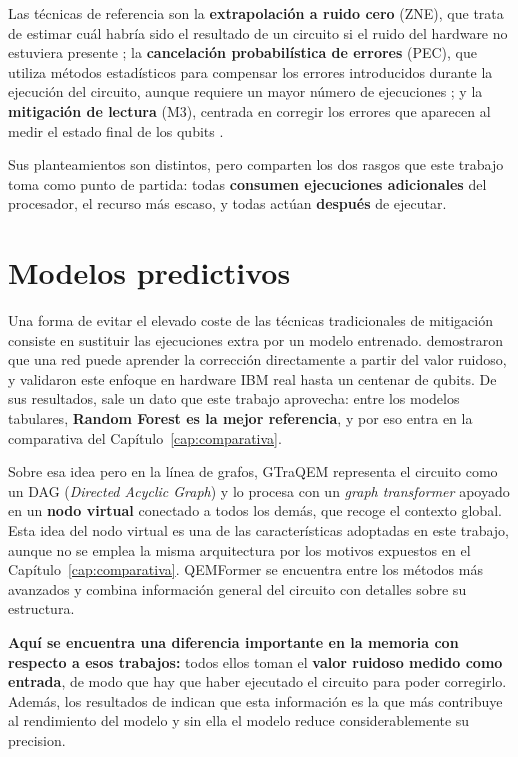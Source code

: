 Las técnicas de referencia son la \textbf{extrapolación a ruido cero} (ZNE), que trata de estimar cuál habría sido el resultado de un circuito si el ruido del hardware no estuviera presente \cite{temme2017error}; la \textbf{cancelación probabilística de errores} (PEC), que utiliza métodos estadísticos para compensar los errores introducidos durante la ejecución del circuito, aunque requiere un mayor número de ejecuciones \cite{cai2023quantum}; y la \textbf{mitigación de lectura} (M3), centrada en corregir los errores que aparecen al medir el estado final de los qubits \cite{nation2023suppressing}. 

Sus planteamientos son distintos, pero comparten los dos rasgos
que este trabajo toma como punto de partida: todas \textbf{consumen ejecuciones adicionales}
del procesador, el recurso más escaso, y todas actúan \textbf{después} de ejecutar.

\section{Modelos predictivos}
\label{sec:ml_qem}

Una forma de evitar el elevado coste de las técnicas tradicionales de mitigación consiste en sustituir las ejecuciones extra por un modelo entrenado.
 demostraron que una red puede aprender la corrección directamente a
partir del valor ruidoso, y validaron este enfoque en hardware IBM real hasta un centenar de
qubits. De sus resultados, sale un dato que este trabajo aprovecha: entre los modelos tabulares,
\textbf{Random Forest es la mejor referencia}, y por eso entra en la comparativa del
Capítulo~\ref{cap:comparativa}.

Sobre esa idea pero en la línea de grafos, GTraQEM \cite{bao2025gtraqem} representa el circuito como
un DAG (\textit{Directed Acyclic Graph}) y lo procesa con un \textit{graph transformer} apoyado en un \textbf{nodo virtual}
conectado a todos los demás, que recoge el contexto global. Esta idea del nodo virtual es una de las características adoptadas en este trabajo, aunque no se emplea la misma arquitectura por los motivos expuestos en el Capítulo~\ref{cap:comparativa}. QEMFormer \cite{bao2025qemformer} se encuentra entre los métodos más avanzados y combina información general del circuito con detalles sobre su estructura.

\textbf{Aquí se encuentra una diferencia importante en la memoria con respecto a esos trabajos:} todos ellos toman el \textbf{valor
ruidoso medido como entrada}, de modo que hay que haber ejecutado el circuito para poder
corregirlo. Además, los resultados de  indican que esta información es la que más contribuye al rendimiento del modelo y sin ella el modelo reduce considerablemente su precision.

